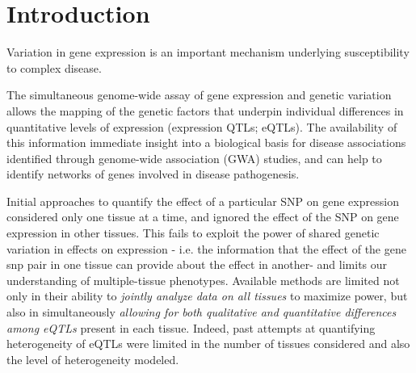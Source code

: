\documentclass[10pt,letterpaper]{article}
\begin{document}



\linenumbers

\section*{Introduction}
Variation in gene expression is an important mechanism underlying susceptibility to complex disease.  

The simultaneous genome-wide assay of gene expression and genetic variation allows the mapping of the genetic factors that underpin individual differences in quantitative levels of expression (expression QTLs; eQTLs). 
The availability of this information immediate insight into a biological basis for disease associations identified through genome-wide association (GWA) studies, and can help to identify networks of genes 
involved in disease pathogenesis.

Initial approaches to quantify the effect of a particular SNP on gene expression considered only one tissue at a time, and ignored the effect of the SNP on gene expression in other tissues.
This fails to exploit the power of  shared genetic variation in effects on expression - i.e. the information that the effect of the gene snp pair in one tissue can provide about the effect in another- and limits our understanding of multiple-tissue phenotypes.
Available methods are limited not only in their ability to {\it jointly analyze data on all tissues} to maximize power, but also in simultaneously {\it allowing for both qualitative and quantitative differences among eQTLs} present in each tissue.
 Indeed, past attempts at quantifying heterogeneity of eQTLs were limited in the number of tissues considered and also the level of heterogeneity modeled.
\end{document}
